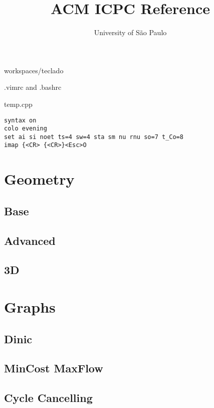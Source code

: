 \documentclass[a4paper,oneside]{article}
\title{ACM ICPC Reference}
\author{University of São Paulo}
\begin{document}
\maketitle
\thispagestyle{fancy}
\tableofcontents
\newpage

\begin{enumerate*}
 \item workspaces/teclado 
 \item .vimrc and .bashrc
 \item temp.cpp
\end{enumerate*}

\begin{lstlisting}
syntax on
colo evening
set ai si noet ts=4 sw=4 sta sm nu rnu so=7 t_Co=8
imap {<CR> {<CR>}<Esc>O
\end{lstlisting}


\section{Geometry}
\subsection{Base}


\subsection{Advanced}


\subsection{3D}


\section{Graphs}
\subsection{Dinic}


\subsection{MinCost MaxFlow}


\subsection{Cycle Cancelling}

\end{document}
